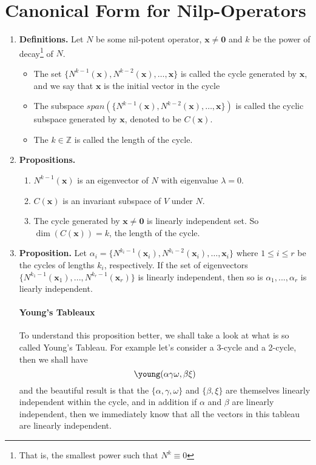 \documentclass[oneside, 12pt]{book}
\newcommand{\settag}[1]{\renewcommand{\theenumi}{#1}}
\newcommand{\tbf}[1]{\textbf{#1}}
\newcommand{\para}[1]{\item \tbf{#1}}
\newcommand{\vx}{\mathbf{x}}
\newcommand{\vzero}{\mathbf{0}}
\begin{document}
\section{Canonical Form for Nilp-Operators}
\begin{enumerate}
    \settag{6.2.1}
    \para{Definitions.} Let $N$ be some nil-potent operator, $\vx\neq\vzero$ and $k$ be the power 
    of decay\footnote{That is, the smallest power such that $N^k\equiv 0$} of $N$. 
    \begin{itemize}
        \item The set $\{N^{k-1}(\vx),N^{k-2}(\vx),\ldots,\vx\}$ is called the cycle generated by $\vx$, and we say that $\vx$ is the initial vector in the cycle
        \item The subspace $span(\{N^{k-1}(\vx),N^{k-2}(\vx),\ldots,\vx\})$ is called the cyclic subspace generated by $\vx$, denoted to be $C(\vx)$.
        \item The $k\in \mathbb{Z}$ is called the length of the cycle.
    \end{itemize}

    \settag{6.2.3}
    \para{Propositions.}
    \begin{enumerate}
        \item $N^{k-1}(\vx)$ is an eigenvector of $N$ with eigenvalue $\lambda = 0$.
        \item $C(\vx)$ is an invariant subspace of $V$ under $N$.
        \item The cycle generated by $\vx\neq \vzero$ is linearly independent set. So $\dim(C(\vx)) = k$, the length of the cycle.
    \end{enumerate}

    \settag{6.2.4}
    \para{Proposition.} Let $\alpha_i = \{N^{k_i-1}(\vx_i),N^{k_i-2}(\vx_i),\ldots,\vx_i\}$ where $1\leq i\leq r$ be
    the cycles of lengths $k_i$, respectively. If the set of eigenvectors $\{N^{k_1-1}(\vx_1),...,N^{k_r-1}(\vx_r)\}$ is linearly
    independent, then so is $\alpha_1,...,\alpha_r$ is liearly independent.
    \paragraph{Young's Tableaux} To understand this proposition better, we shall take a look at what is so called
    Young's Tableau. For example let's consider a 3-cycle and a 2-cycle, then we shall have
    \begin{equation*}
        \young(\alpha\gamma\omega,\beta\xi)
    \end{equation*}
    and the beautiful result is that the $\{\alpha,\gamma,\omega\}$ and $\{\beta,\xi\}$ are themselves linearly independent within the cycle, and in 
    addition if $\alpha$ and $\beta$ are linearly independent, then we immediately know that all the vectors in this tableau are linearly independent.


\end{enumerate}
\end{document}
